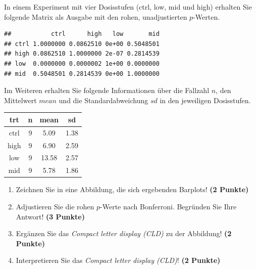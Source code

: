 \documentclass[a4paper, 10pt]{scrartcl}\usepackage[]{graphicx}\usepackage[]{xcolor}
\makeatletter
\newenvironment{kframe}{%
 \def\at@end@of@kframe{}%
 \ifinner\ifhmode%
  \def\at@end@of@kframe{\end{minipage}}%
  \begin{minipage}{\columnwidth}%
 \fi\fi%
 \def\FrameCommand##1{\hskip\@totalleftmargin \hskip-\fboxsep
 \colorbox{shadecolor}{##1}\hskip-\fboxsep
     \hskip-\linewidth \hskip-\@totalleftmargin \hskip\columnwidth}%
 \MakeFramed {\advance\hsize-\width
   \@totalleftmargin\z@ \linewidth\hsize
   \@setminipage}}%
 {\par\unskip\endMakeFramed%
 \at@end@of@kframe}
\newenvironment{knitrout}{}{} %
\makeatother
\begin{document}
In einem Experiment mit vier Dosisstufen (ctrl, low, mid und high) erhalten Sie
folgende Matrix als \Rlogo Ausgabe mit den rohen, unadjustierten $p$-Werten. 



\begin{knitrout}
\color{fgcolor}\begin{kframe}
\begin{verbatim}
##           ctrl      high   low       mid
## ctrl 1.0000000 0.0862510 0e+00 0.5048501
## high 0.0862510 1.0000000 2e-07 0.2814539
## low  0.0000000 0.0000002 1e+00 0.0000000
## mid  0.5048501 0.2814539 0e+00 1.0000000
\end{verbatim}
\end{kframe}
\end{knitrout}

Im Weiteren erhalten Sie folgende Informationen {\"u}ber die Fallzahl $n$, den
Mittelwert $mean$ und die Standardabweichung $sd$ in den jeweiligen Dosisstufen.

\begin{knitrout}
\color{fgcolor}\begin{table}[!h]
\centering
\begin{tabular}{cccc}
\toprule
trt & n & mean & sd\\
\midrule
ctrl & 9 & 5.09 & 1.38\\
high & 9 & 6.90 & 2.59\\
low & 9 & 13.58 & 2.57\\
mid & 9 & 5.78 & 1.86\\
\bottomrule
\end{tabular}
\end{table}

\end{knitrout}


\begin{enumerate}
\item Zeichnen Sie in eine Abbildung, die sich ergebenden Barplots! \textbf{(2 Punkte)}
\item Adjustieren Sie die rohen $p$-Werte nach Bonferroni. Begr{\"u}nden Sie Ihre Antwort! \textbf{(3 Punkte)}
\item Erg{\"a}nzen Sie das \textit{Compact letter display (CLD)} zu der
  Abbildung! \textbf{(2 Punkte)}
\item Interpretieren Sie das \textit{Compact letter display (CLD)}! \textbf{(2 Punkte)} 
\end{enumerate}
\end{document}
